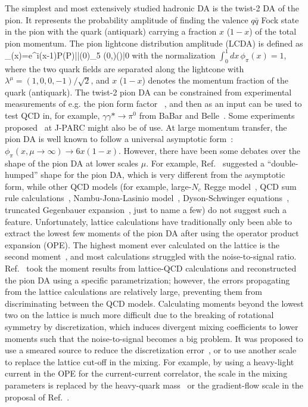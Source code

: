 The simplest and most extensively studied hadronic DA is the twist-2 DA of the pion. It represents the probability amplitude of finding the valence $q\bar q$ Fock state in the pion with the quark (antiquark) carrying a fraction $x$ ($1-x$) of the total pion momentum. 
The pion lightcone distribution amplitude (LCDA) is defined as 
\beq\label{LCDA}
\phi_{\pi}(x)={}\int{}e^{i(x-1)\xi\lambda\cdot P}\langle \pi(P)|\bar \psi(0)\lambda\cdot\gamma\gamma_5 \Gamma(0,\xi\lambda)\psi(\xi\lambda)|0\rangle
\eeq
with the normalization $\int_0^1 dx\, \phi_\pi(x)=1$, where the two quark fields are separated along the lightcone with $\lambda^\mu=(1,0,0,-1)/\sqrt 2$, and $x$ ($1-x$) denotes the momentum fraction of the quark (antiquark).
The twist-2 pion DA can be constrained from experimental measurements of e.g. the pion form factor~\cite{Farrar:1979aw}%
, and then as an input can be used to test QCD in, for example, $\gamma \gamma* \rightarrow \pi^0$ from BaBar and Belle~\cite{Aubert:2009mc,Uehara:2012ag}.
Some experiments proposed~\cite{Sawada:2016mao} at J-PARC might also be of use.
At large momentum transfer, the pion DA is well known to follow a universal asymptotic form~\cite{Lepage:1979zb}:  
$\phi_\pi(x, \mu \to \infty) \rightarrow 6 x(1-x)$.
However, 
there have been some debates over the shape of the pion DA at lower scales $\mu$.
For example, Ref.~\cite{Chernyak:1981zz} suggested a ``double-humped'' shape for the pion DA, which is very different from the asymptotic form, while other QCD models (for example, large-$N_c$ Regge model~\cite{RuizArriola:2006jge}, 
QCD sum rule calculations~\cite{Radyushkin:1994xv},
Nambu-Jona-Lasinio model~\cite{RuizArriola:2002bp},
Dyson-Schwinger equations~\cite{Chang:2013pq}, truncated Gegenbauer expansion~\cite{Agaev:2012tm}, just to name a few) 
do not suggest such a feature. Unfortunately, lattice calculations have traditionally only been able to extract the lowest few moments of the pion DA after using the operator product expansion (OPE). The highest moment ever calculated on the lattice is the second moment~\cite{Braun:2015axa,Arthur:2010xf,Braun:2006dg,Daniel:1990ah,Martinelli:1987si}, and most calculations struggled with the noise-to-signal ratio. Ref.~\cite{Cloet:2013tta} took the moment results from lattice-QCD calculations and reconstructed the pion DA using a specific parametrization; however, the errors propagating from the lattice calculations are relatively large, preventing them from discriminating between the QCD models. Calculating moments beyond the lowest two on the lattice is much more difficult due to the breaking of rotational symmetry by discretization, which induces divergent mixing coefficients to lower moments such that the noise-to-signal becomes a big problem. It was proposed to use a smeared source to reduce the discretization error~\cite{Davoudi:2012ya}, or to use another scale to replace the lattice cut-off in the mixing. For example, by using a heavy-light current in the OPE for the current-current correlator, the scale in the mixing parameters is replaced by the heavy-quark mass~\cite{Detmold:2005gg} or the gradient-flow scale in the proposal of Ref.~\cite{Monahan:2016bvm}.
